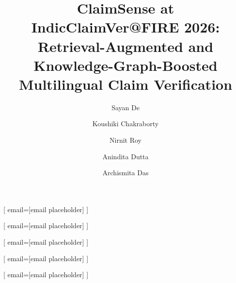 \documentclass[
]{ceurart}
\begin{document}



\title{ClaimSense at IndicClaimVer@FIRE 2026: Retrieval-Augmented and
  Knowledge-Graph-Boosted Multilingual Claim Verification}

\author[1]{Sayan De}[%
  email=[email placeholder]
]
\author[1]{Koushiki Chakraborty}[%
  email=[email placeholder]
]
\author[1]{Nirnit Roy}[%
  email=[email placeholder]
]
\author[1]{Anindita Dutta}[%
  email=[email placeholder]
]
\author[1]{Archismita Das}[%
  email=[email placeholder]
]

\address[1]{[Affiliation / institution name placeholder]}

\end{document}

